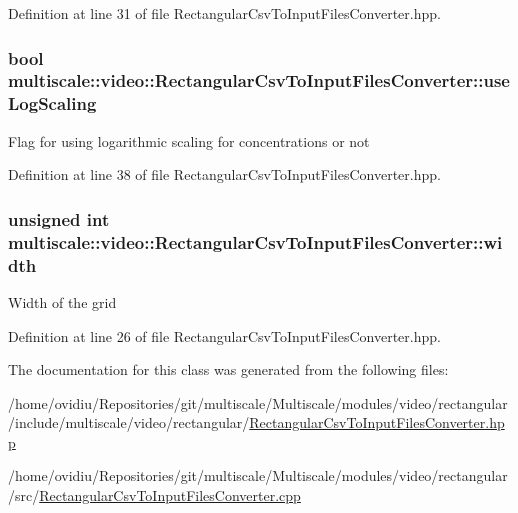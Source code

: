 Definition at line 31 of file Rectangular\-Csv\-To\-Input\-Files\-Converter.\-hpp.

\hypertarget{classmultiscale_1_1video_1_1RectangularCsvToInputFilesConverter_a7739ee04a9340d981896861904022f26}{
\subsubsection[{use\-Log\-Scaling}]{\setlength{\rightskip}{0pt plus 5cm}bool multiscale\-::video\-::\-Rectangular\-Csv\-To\-Input\-Files\-Converter\-::use\-Log\-Scaling\hspace{0.3cm}{\ttfamily [private]}}}\label{classmultiscale_1_1video_1_1RectangularCsvToInputFilesConverter_a7739ee04a9340d981896861904022f26}
Flag for using logarithmic scaling for concentrations or not 

Definition at line 38 of file Rectangular\-Csv\-To\-Input\-Files\-Converter.\-hpp.

\hypertarget{classmultiscale_1_1video_1_1RectangularCsvToInputFilesConverter_a7fe7f3d014535567fbeb465eb01cde1b}{
\subsubsection[{width}]{\setlength{\rightskip}{0pt plus 5cm}unsigned int multiscale\-::video\-::\-Rectangular\-Csv\-To\-Input\-Files\-Converter\-::width\hspace{0.3cm}{\ttfamily [private]}}}\label{classmultiscale_1_1video_1_1RectangularCsvToInputFilesConverter_a7fe7f3d014535567fbeb465eb01cde1b}
Width of the grid 

Definition at line 26 of file Rectangular\-Csv\-To\-Input\-Files\-Converter.\-hpp.



The documentation for this class was generated from the following files\-:\begin{DoxyCompactItemize}
\item 
/home/ovidiu/\-Repositories/git/multiscale/\-Multiscale/modules/video/rectangular/include/multiscale/video/rectangular/\hyperlink{RectangularCsvToInputFilesConverter_8hpp}{Rectangular\-Csv\-To\-Input\-Files\-Converter.\-hpp}\item 
/home/ovidiu/\-Repositories/git/multiscale/\-Multiscale/modules/video/rectangular/src/\hyperlink{RectangularCsvToInputFilesConverter_8cpp}{Rectangular\-Csv\-To\-Input\-Files\-Converter.\-cpp}\end{DoxyCompactItemize}
